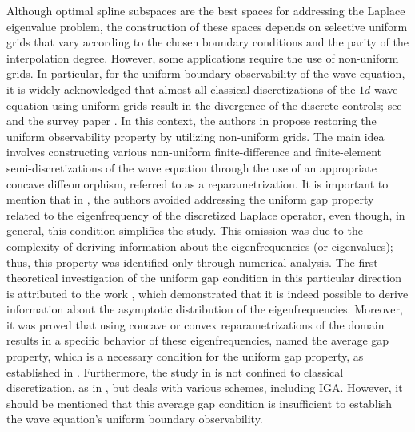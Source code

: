 \documentclass[11pt]{article}
\begin{document}
Although optimal spline subspaces \cite{manni2022application} are the best spaces for addressing the Laplace eigenvalue problem, the construction of these spaces depends on selective uniform grids that vary according to the chosen boundary conditions and the parity of the interpolation degree. However, some applications require the use of non-uniform grids. In particular, for the uniform boundary observability of the wave equation, it is widely acknowledged that almost all classical discretizations of the $1d$ wave equation using uniform grids result in the divergence of the discrete controls; see \cite{glowinski1995exact,infante1999boundary} and the survey paper \cite{zuazua2005propagation}. In this context, the authors in \cite{ervedoza2016numerical} propose restoring the uniform observability property by utilizing non-uniform grids. The main idea involves constructing various non-uniform finite-difference and finite-element semi-discretizations of the wave equation through the use of an appropriate concave diffeomorphism,  referred to as a reparametrization. It is important to mention that in \cite{ervedoza2016numerical}, the authors avoided addressing the uniform gap property related to the eigenfrequency of the discretized Laplace operator, even though, in general, this condition simplifies the study. This omission was due to the complexity of deriving information about the eigenfrequencies (or eigenvalues); thus, this property was identified only through numerical analysis. The first theoretical investigation of the uniform gap condition in this particular direction is attributed to the work \cite{bianchi2018spectral}, which demonstrated that it is indeed possible to derive information about the asymptotic distribution of the eigenfrequencies. Moreover, it was proved that using concave or convex reparametrizations of the domain results in a specific behavior of these eigenfrequencies, named the average gap property, which is a necessary condition for the uniform gap property, as established in \cite{bianchi2018spectral}. Furthermore, the study in \cite{bianchi2018spectral} is not confined to classical discretization, as in \cite{ervedoza2016numerical}, but deals with various schemes, including IGA. However, it should be mentioned that this average gap condition is insufficient to establish the wave equation's uniform boundary observability.
\end{document}
